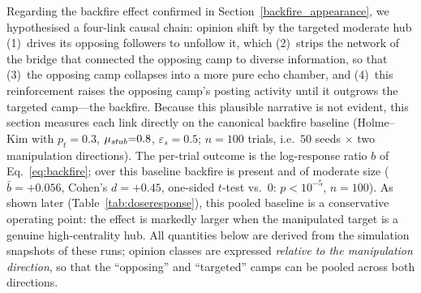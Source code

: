 \documentclass[pdflatex,sn-mathphys-num]{sn-jnl}%
\theoremstyle{thmstyleone}%
\theoremstyle{thmstyletwo}%
\theoremstyle{thmstylethree}%
\def\Stubbornness{\mu_{\it stub}}
\def\ThofOpPreval{\varepsilon_s}
\begin{document}
Regarding the backfire effect confirmed in Section~\ref{backfire_appearance}, 
we hypothesised a four-link
causal chain: opinion shift by the targeted moderate hub (1)~drives its opposing
followers to unfollow it, which (2)~strips the network of the bridge that
connected the opposing camp to diverse information, so that (3)~the opposing camp
collapses into a more pure echo chamber, and (4)~this reinforcement raises the
opposing camp's posting activity until it outgrows the targeted camp---the
backfire. Because this plausible narrative is not evident, this section measures
each link directly on the canonical backfire baseline (Holme--Kim with
$p_t{=}0.3$, $\Stubbornness{=}0.8$, $\ThofOpPreval{=}0.5$; $n{=}100$ trials, i.e.\
$50$ seeds $\times$ two manipulation directions). The per-trial outcome is the
log-response ratio $b$ of Eq.~\ref{eq:backfire}; over this baseline backfire is
present and of moderate size ($\bar b = +0.056$, Cohen's $d = +0.45$, one-sided $t$-test
vs.\ $0$: $p < 10^{-5}$, $n{=}100$). As shown later
(Table~\ref{tab:doseresponse}), this pooled baseline is a conservative
operating point: the effect is markedly larger when the manipulated target is a
genuine high-centrality hub. All quantities below are derived from the
simulation snapshots of these runs; opinion classes
are expressed \emph{relative to the manipulation direction}, so that the
``opposing'' and ``targeted'' camps can be pooled across both directions.
\par
\end{document}
